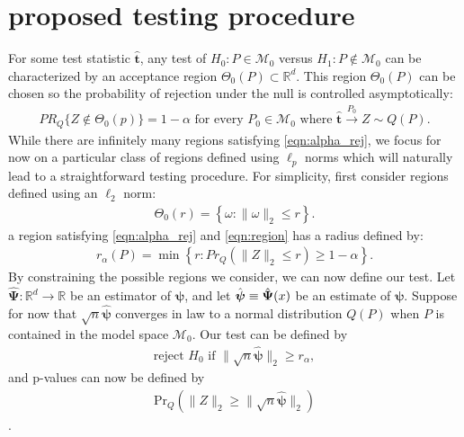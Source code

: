 \documentclass{article}
\newcommand{\disto}{P}
\newcommand{\tst}{\hat{\boldsymbol{t}}}
\newcommand{\rvv}{Z}
\newcommand{\distv}{Q}
\begin{document}
\section{proposed testing procedure}
\label{sec:prop_test_proc}
For some test statistic $\tst$, any test of $H_0 : \disto \in \mathscr{M}_0$ versus $H_1 : \disto \not\in \mathscr{M}_0$ can be characterized by an acceptance region $\Theta_0(\disto) \subset \mathbb{R}^d$. This region $\Theta_0(\disto)$ can be chosen so the probability of rejection under the null is controlled asymptotically:
\begin{align}
  PR_{\distv}\{\rvv \not \in \Theta_0(p)\} = 1 - \alpha \text{ for every } P_0 \in \mathscr{M}_0 \text{ where } \tst \xrightarrow{P_0} \rvv \sim \distv(\disto).\label{eqn:alpha_rej}
\end{align}
While there are infinitely many regions satisfying \eqref{eqn:alpha_rej},  we focus for now on a particular class of regions defined using $\ell_p$ norms which will naturally lead to a straightforward testing procedure. For simplicity, first consider regions defined using an $\ell_2$ norm:
\begin{align}
	\Theta_0(r) = \left\{\omega : \|\omega\|_2 \leq r\right\}. \label{eqn:region}
\end{align}
a region satisfying \eqref{eqn:alpha_rej} and \eqref{eqn:region} has a radius defined by: 
\begin{align*}
	r_\alpha(\disto) = \min\left\{r : Pr_{\distv}(\|\rvv\|_2 \leq r) \geq 1 - \alpha \right\}.
\end{align*}
By constraining the possible regions we consider, we can now define our test.  Let $\hat{\boldsymbol{\Psi}} : \mathbb{R}^d \to \mathbb{R}$ be an estimator of $\boldsymbol{\psi}$, and let $\Hat{\boldsymbol{\psi}} \equiv \hat{\boldsymbol{\Psi}}(x)$ be an estimate of $\boldsymbol{\psi}$. Suppose for now that $\sqrt{n}\hat{\boldsymbol{\psi}}$ converges in law to a normal distribution $\distv(P)$ when $P$ is contained in the model space  $\mathcal{M}_0$.  Our test can be defined by 
\begin{align}
\label{eqn:simp_test}
	\text{reject } H_0 \text{ if } \|\sqrt{n} \hat{\boldsymbol{\psi}}\|_2 \geq r_\alpha,
\end{align} and p-values can now be defined by 
\begin{align}
	\text{Pr}_\distv(\|\rvv\|_2 \geq \|\sqrt{n} \hat{\boldsymbol{\psi}}\|_2)
\end{align}. 
\end{document}
